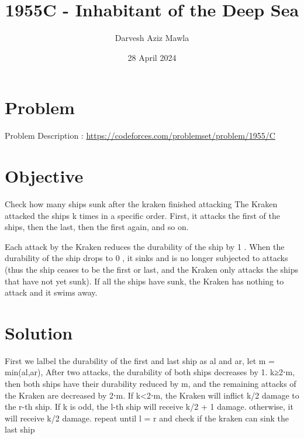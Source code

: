 \documentclass{article}
\title{1955C - Inhabitant of the Deep Sea
}
\author{Darvesh Aziz Mawla}
\date{28 April 2024}
\begin{document}
\maketitle


\section{Problem}

Problem Description : \href{https://codeforces.com/problemset/problem/1955/C}{https://codeforces.com/problemset/problem/1955/C}

\section{Objective}

Check how many ships sunk after the kraken finished attacking 
The Kraken attacked the ships k
 times in a specific order. First, it attacks the first of the ships, then the last, then the first again, and so on.

Each attack by the Kraken reduces the durability of the ship by 1
. When the durability of the ship drops to 0
, it sinks and is no longer subjected to attacks (thus the ship ceases to be the first or last, and the Kraken only attacks the ships that have not yet sunk). If all the ships have sunk, the Kraken has nothing to attack and it swims away.

\section{Solution}

First we lalbel the durability of the first and last ship as al and ar, let m = min(al,ar),  After two attacks, the durability of both ships decreases by 1. k≥2⋅m, then both ships have their durability reduced by m, and the remaining attacks of the Kraken are decreased by 2⋅m. If k<2⋅m, the Kraken will inflict k/2 damage to the r-th ship. If k is odd, the l-th ship will receive k/2 + 1 damage. otherwise, it will receive k/2 damage. repeat until l = r and check if the kraken can sink the last ship

\end{document}
